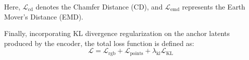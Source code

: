 Here, \( \mathcal{L}_{\text{cd}} \) denotes the Chamfer Distance (CD), and \( \mathcal{L}_{\text{emd}} \) represents the Earth Mover's Distance (EMD).

Finally, incorporating KL divergence regularization on the anchor latents produced by the encoder, the total loss function is defined as:
\begin{equation}
    \mathcal{L} = \mathcal{L}_{\text{rgb}} + \mathcal{L}_{\text{points}} + \lambda_{\text{kl}} \mathcal{L}_{\text{KL}}
\end{equation}





